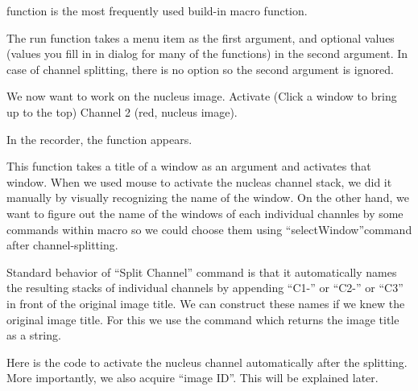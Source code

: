  function is the most frequently used build-in macro function.

\begin{indentCom}
\end{indentCom}


The run function takes a menu item as the first argument, and optional values (values you fill in in dialog for many of the functions) in the second argument. In case of channel splitting, there is no option so the second argument is ignored.

We now want to work on the nucleus image. Activate (Click a window to bring up to the top) Channel 2 (red, nucleus image).

In the recorder, the function  appears.


This function takes a title of a window as an argument and activates that window. When we used mouse to activate the nucleas channel stack, we did it manually by visually recognizing the name of the window. On the other hand, we want to figure out the name of the windows of each individual channles by some commands within macro so we could choose them using ``selectWindow''command after channel-splitting.

Standard behavior of ``Split Channel'' command is that it automatically names the resulting stacks of individual channels by appending ``C1-'' or ``C2-'' or ``C3'' in front of the original image title. We can construct these names if we knew the original image title. For this we use the command  which returns the image title as a string.


Here is the code to activate the nucleus channel automatically after the splitting. More importantly, we also acquire ``image ID''. This will be explained later.